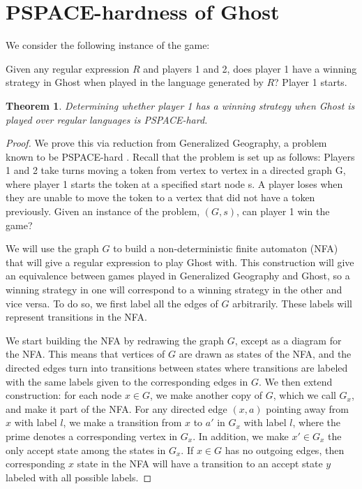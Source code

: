 \documentclass[11pt]{article}
\newtheorem{theorem}{Theorem}
\begin{document}
\section{PSPACE-hardness of Ghost}
We consider the following instance of the game:

Given any regular expression $R$ and players 1 and 2, does player 1 have a winning strategy in Ghost when played in the language generated by $R$? Player 1 starts.
\begin{theorem} Determining whether player 1 has a winning strategy when Ghost is played over regular languages is PSPACE-hard.
\end{theorem}
\begin{proof} We prove this via reduction from Generalized Geography, a problem known to be PSPACE-hard \cite{theoryofcomp}. Recall that the problem is set up as follows:
Players 1 and 2 take turns moving a token from vertex to vertex in a directed graph G, where player 1 starts the token at a specified start node s. A player loses when they are unable to move the token to a vertex that did not have a token previously. Given an instance of the problem, $(G,s)$, can player 1 win the game?

We will use the graph $G$ to build a non-deterministic finite automaton (NFA) that will give a regular expression to play Ghost with. This construction will give an equivalence between games played in Generalized Geography and Ghost, so a winning strategy in one will correspond to a winning strategy in the other and vice versa. To do so, we first label all the edges of $G$ arbitrarily. These labels will represent transitions in the NFA.

We start building the NFA by redrawing the graph $G$, except as a diagram for the NFA. This means that vertices of $G$ are drawn as states of the NFA, and the directed edges turn into transitions between states where transitions are labeled with the same labels given to the corresponding edges in $G$. We then extend construction: for each node $x\in G$, we make another copy of $G$, which we call $G_x$, and make it part of the NFA. For any directed edge $(x,a)$ pointing away from $x$ with label $l$, we make a transition from $x$ to $a'$ in $G_x$ with label $l$, where the prime denotes a corresponding vertex in $G_x$. In addition, we make $x' \in G_x$  the only accept state among the states in $G_x$. If $x\in G$ has no outgoing edges, then corresponding $x$ state in the NFA will have a transition to an accept state $y$ labeled with all possible labels. 


\end{proof}
\end{document}

